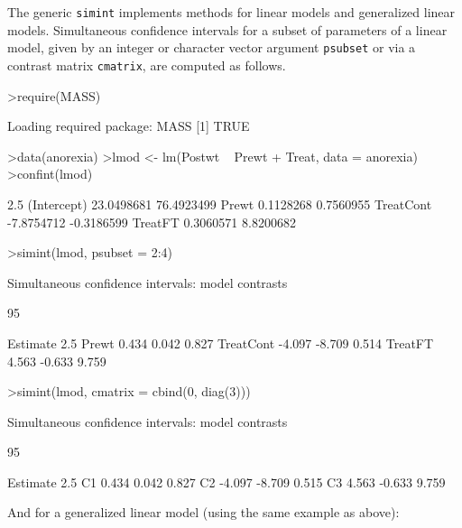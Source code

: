 \documentclass{article}
\begin{document}
The generic \texttt{simint} implements methods for linear models and
generalized linear models. Simultaneous confidence intervals for a subset
of parameters of a linear model, given by an integer or character vector
argument \texttt{psubset} or via a contrast matrix \texttt{cmatrix}, 
are computed as follows.
\small
\begin{Schunk}
\begin{Sinput}
>require(MASS)
\end{Sinput}
\begin{Soutput}
Loading required package: MASS 
[1] TRUE
\end{Soutput}
\begin{Sinput}
>data(anorexia)
>lmod <- lm(Postwt ~ Prewt + Treat, data = anorexia)
>confint(lmod)
\end{Sinput}
\begin{Soutput}
                 2.5 %     97.5 %
(Intercept) 23.0498681 76.4923499
Prewt        0.1128268  0.7560955
TreatCont   -7.8754712 -0.3186599
TreatFT      0.3060571  8.8200682
\end{Soutput}
\begin{Sinput}
>simint(lmod, psubset = 2:4)
\end{Sinput}
\begin{Soutput}
	Simultaneous confidence intervals: model contrasts

	95 % confidence intervals

          Estimate  2.5 % 97.5 %
Prewt        0.434  0.042  0.827
TreatCont   -4.097 -8.709  0.514
TreatFT      4.563 -0.633  9.759
\end{Soutput}
\begin{Sinput}
>simint(lmod, cmatrix = cbind(0, diag(3)))
\end{Sinput}
\begin{Soutput}
	Simultaneous confidence intervals: model contrasts

	95 % confidence intervals

   Estimate  2.5 % 97.5 %
C1    0.434  0.042  0.827
C2   -4.097 -8.709  0.515
C3    4.563 -0.633  9.759
\end{Soutput}
\end{Schunk}
\normalsize
And for a generalized linear model (using the same example as above):
\small
\end{document}
